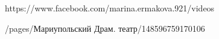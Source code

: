  
 
 
 
 

https://www.facebook.com/marina.ermakova.921/videos


/pages/Мариупольский Драм. театр/148596759170106
